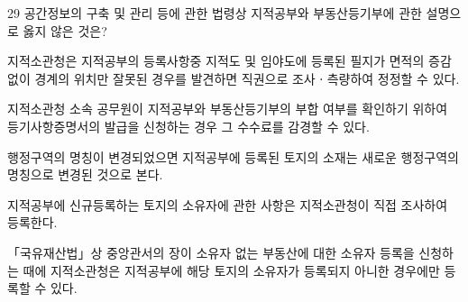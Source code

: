 \begin{question}{29}
공간정보의 구축 및 관리 등에 관한 법령상 지적공부와 부동산등기부에 관한 설명으로 옳지 않은 것은?
\begin{choices}
  \item 지적소관청은 지적공부의 등록사항중 지적도 및 임야도에 등록된 필지가 면적의 증감 없이 경계의 위치만 잘못된 경우를 발견하면 직권으로 조사ㆍ측량하여 정정할 수 있다.
  \item 지적소관청 소속 공무원이 지적공부와 부동산등기부의 부합 여부를 확인하기 위하여 등기사항증명서의 발급을 신청하는 경우 그 수수료를 감경할 수 있다.
  \item 행정구역의 명칭이 변경되었으면 지적공부에 등록된 토지의 소재는 새로운 행정구역의 명칭으로 변경된 것으로 본다.
  \item 지적공부에 신규등록하는 토지의 소유자에 관한 사항은 지적소관청이 직접 조사하여 등록한다.
  \item 「국유재산법」상 중앙관서의 장이 소유자 없는 부동산에 대한 소유자 등록을 신청하는 때에 지적소관청은 지적공부에 해당 토지의 소유자가 등록되지 아니한 경우에만 등록할 수 있다.
\end{choices}
\end{question}
